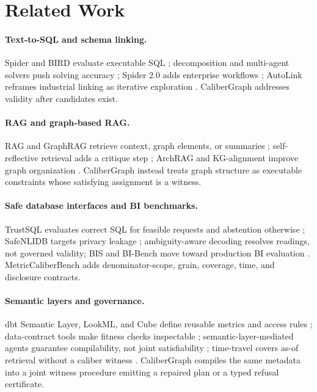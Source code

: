 \documentclass[letterpaper]{article}
\begin{document}
\section{Related Work}

\paragraph{Text-to-SQL and schema linking.}
 Spider and BIRD evaluate executable SQL \citep{spider,bird}; decomposition and multi-agent solvers push solving accuracy \citep{dinsql2023,macsql2023,chess2024}; Spider 2.0 adds enterprise workflows \citep{spider2}; AutoLink reframes industrial linking as iterative exploration \citep{autolink2026}. CaliberGraph addresses validity after candidates exist.

\paragraph{RAG and graph-based RAG.}
 RAG and GraphRAG retrieve context, graph elements, or summaries \citep{rag,graphrag}; self-reflective retrieval adds a critique step \citep{selfrag}; ArchRAG and KG-alignment improve graph organization \citep{archrag2026,kgalignment2025}. CaliberGraph instead treats graph structure as executable constraints whose satisfying assignment is a witness.

\paragraph{Safe database interfaces and BI benchmarks.}
 TrustSQL evaluates correct SQL for feasible requests and abstention otherwise \citep{trustsql2024}; SafeNLIDB targets privacy leakage \citep{safenlidb2026}; ambiguity-aware decoding \citep{ambiqt2023} resolves readings, not governed validity; BIS and BI-Bench move toward production BI evaluation \citep{bis2024,bibench2025}. MetricCaliberBench adds denominator-scope, grain, coverage, time, and disclosure contracts.

\paragraph{Semantic layers and governance.}
 dbt Semantic Layer, LookML, and Cube define reusable metrics and access rules \citep{dbtsemantic,lookml,cube}; data-contract tools make fitness checks inspectable \citep{great_expectations_contracts}; semantic-layer-mediated agents guarantee compilability, not joint satisfiability \citep{smq2026}; time-travel covers as-of retrieval without a caliber witness \citep{temptabqa2023}. CaliberGraph compiles the same metadata into a joint witness procedure emitting a repaired plan or a typed refusal certificate.
\end{document}
